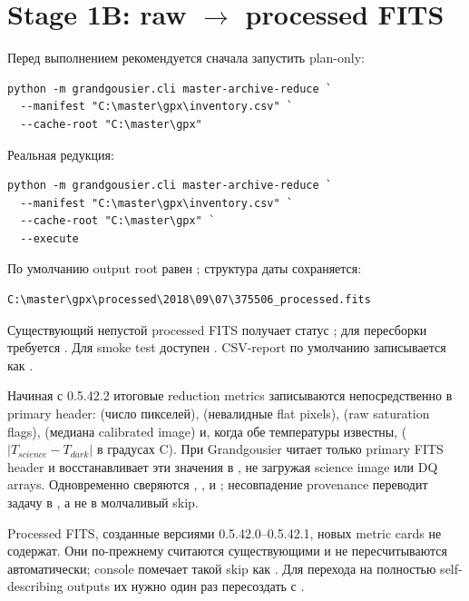 \section{Stage 1B: raw $\rightarrow$ processed FITS}

Перед выполнением рекомендуется сначала запустить plan-only:

\begin{lstlisting}
python -m grandgousier.cli master-archive-reduce `
  --manifest "C:\master\gpx\inventory.csv" `
  --cache-root "C:\master\gpx"
\end{lstlisting}

Реальная редукция:

\begin{lstlisting}
python -m grandgousier.cli master-archive-reduce `
  --manifest "C:\master\gpx\inventory.csv" `
  --cache-root "C:\master\gpx" `
  --execute
\end{lstlisting}

По умолчанию output root равен ; структура даты сохраняется:

\begin{verbatim}
C:\master\gpx\processed\2018\09\07\375506_processed.fits
\end{verbatim}

Существующий непустой processed FITS получает статус ; для пересборки требуется . Для smoke test доступен . CSV-report по умолчанию записывается как .

Начиная с 0.5.42.2 итоговые reduction metrics записываются непосредственно в primary header:  (число пикселей),  (невалидные flat pixels),  (raw saturation flags),  (медиана calibrated image) и, когда обе температуры известны,  ($|T_{science}-T_{dark}|$ в градусах C). При  Grandgousier читает только primary FITS header и восстанавливает эти значения в , не загружая science image или DQ arrays. Одновременно сверяются , ,  и ; несовпадение provenance переводит задачу в , а не в молчаливый skip.

Processed FITS, созданные версиями 0.5.42.0--0.5.42.1, новых metric cards не содержат. Они по-прежнему считаются существующими и не пересчитываются автоматически; console помечает такой skip как . Для перехода на полностью self-describing outputs их нужно один раз пересоздать с .

